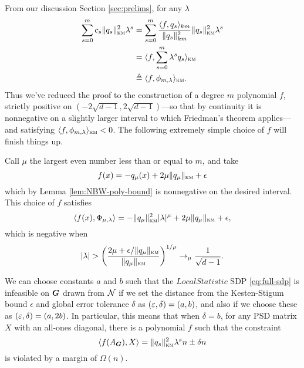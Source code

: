 From our discussion Section \ref{sec:prelims}, for any $\lambda$
\begin{align*}
    \sum_{s=0}^m c_s \|q_s\|^2_{\textsc{km}}\lambda^s 
    &= \sum_{s=0}^m \frac{\langle f,q_s \rangle_{km}}{\|q_s\|^2_{km}}\|q_s\|^2_{\textsc{km}}\lambda^s \\
    &= \langle f, \sum_{s=0}^m \lambda^s q_s \rangle_{\textsc{km}} \\
    &\triangleq \langle f, \phi_{m,\lambda} \rangle_{\textsc{km}}.
\end{align*}
Thus we've reduced the proof to the construction of a degree $m$ polynomial $f$, strictly positive on $(-2\sqrt{d-1},2\sqrt{d-1})$---so that by continuity it is nonnegative on a slightly larger interval to which Friedman's theorem applies---and satisfying $\langle f, \phi_{m,\lambda}\rangle_{\textsc{km}} < 0$. The following extremely simple choice of $f$ will finish things up.

Call $\mu$ the largest even number less than or equal to $m$, and take 
$$
    f(x) = -q_\mu(x) + 2\mu\|q_\mu\|_{\textsc{km}} + \epsilon
$$
which by Lemma \ref{lem:NBW-poly-bound} is nonnegative on the desired interval. This choice of $f$ satisfies
$$
    \langle f(x),\Phi_{\mu,\lambda}\rangle = -\|q_\mu\|^2_{\textsc{km}}|\lambda|^\mu + 2\mu\|q_\mu\|_{\textsc{km}} + \epsilon,
$$
which is negative when
$$
    |\lambda| > \left(\frac{2\mu + \epsilon/\|q_\mu\|_{\textsc{km}}}{\|q_\mu\|_{\textsc{km}}}\right)^{1/\mu} \to_\mu \frac{1}{\sqrt{d-1}}.
$$

\begin{remark}  \label{rem:violation-margin}
    We can choose constants $a$ and $b$ such that the $LocalStatistic$ SDP \eqref{eq:full-sdp} is infeasible on $\boldsymbol{G}$ drawn from $\mathcal{N}$ if we set the distance from the Kesten-Stigum bound $\epsilon$ and global error tolerance $\delta$ as $(\varepsilon, \delta) = (a, b)$, and also if we choose these as $(\varepsilon, \delta) = (a, 2b)$. In particular, this means that when $\delta = b$, for any PSD matrix $X$ with an all-ones diagonal, there is a polynomial $f$ such that the constraint
    \[
        \langle f(A_{\boldsymbol{G}}), X\rangle = \|q_s\|^2_{\textsc{km}}\lambda^s n \pm \delta n
    \]
    is violated by a margin of $\Omega(n)$.
\end{remark}

